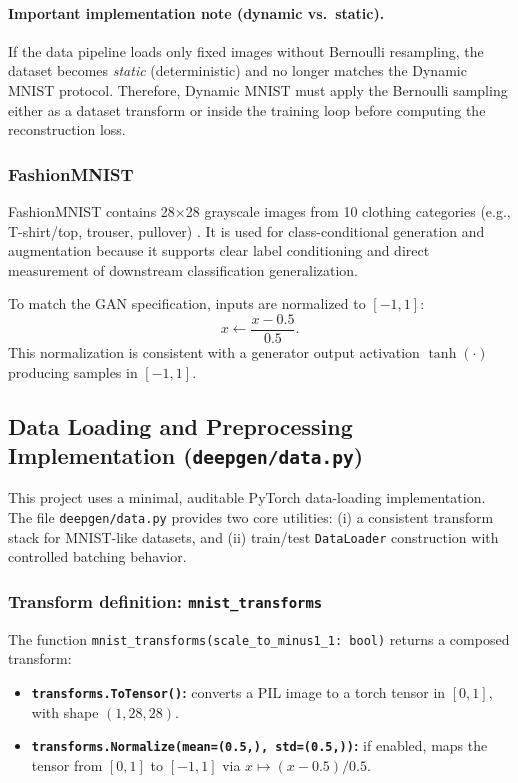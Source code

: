 \paragraph{Important implementation note (dynamic vs.\ static).}
If the data pipeline loads only fixed images without Bernoulli resampling, the dataset becomes \emph{static} (deterministic) and no longer matches the Dynamic MNIST protocol. Therefore, Dynamic MNIST must apply the Bernoulli sampling either as a dataset transform or inside the training loop before computing the reconstruction loss.

\subsubsection{FashionMNIST}
\label{subsec:fashion_mnist}
FashionMNIST contains 28$\times$28 grayscale images from 10 clothing categories (e.g., T-shirt/top, trouser, pullover) \cite{Xiao2017FashionMNIST}. It is used for class-conditional generation and augmentation because it supports clear label conditioning and direct measurement of downstream classification generalization.

To match the GAN specification, inputs are normalized to $[-1,1]$:
\[
x \leftarrow \frac{x-0.5}{0.5}.
\]
This normalization is consistent with a generator output activation $\tanh(\cdot)$ producing samples in $[-1,1]$.

\subsection{Data Loading and Preprocessing Implementation (\texttt{deepgen/data.py})}
\label{subsec:data_py_alignment}

This project uses a minimal, auditable PyTorch data-loading implementation. The file \texttt{deepgen/data.py} provides two core utilities: (i) a consistent transform stack for MNIST-like datasets, and (ii) train/test \texttt{DataLoader} construction with controlled batching behavior.

\subsubsection{Transform definition: \texttt{mnist\_transforms}}
\label{subsubsec:mnist_transforms}
The function
\texttt{mnist\_transforms(scale\_to\_minus1\_1: bool)}
returns a composed transform:
\begin{itemize}
  \item \textbf{\texttt{transforms.ToTensor()}:} converts a PIL image to a torch tensor in $[0,1]$, with shape $(1,28,28)$.
  \item \textbf{\texttt{transforms.Normalize(mean=(0.5,), std=(0.5,))}:} if enabled, maps the tensor from $[0,1]$ to $[-1,1]$ via
  \(
    x \mapsto (x-0.5)/0.5.
  \)
\end{itemize}

